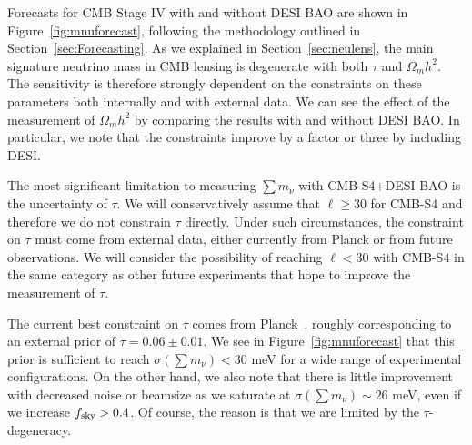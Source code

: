  

Forecasts for CMB Stage IV with and without DESI BAO are shown in Figure~\ref{fig:mnuforecast}, following the methodology outlined in Section~\ref{sec:Forecasting}.  As we explained in Section~\ref{sec:neulens}, the main signature neutrino mass in CMB lensing is degenerate with both $\tau$ and $\Omega_m h^2$.  The sensitivity is therefore strongly dependent on the constraints on these parameters both internally and with external data.  We can see the effect of the measurement of $\Omega_m h^2$ by comparing the results with and without DESI BAO.  In particular, we note that the constraints improve by a factor or three by including DESI.

The most significant limitation to measuring $\sum m_\nu$ with CMB-S4+DESI BAO is the uncertainty of $\tau$.  We will conservatively assume that $\ell \geq 30$ for CMB-S4 and therefore we do not constrain $\tau$ directly.  Under such circumstances, the constraint on $\tau$ must come from external data, either currently from Planck or from future observations.  We will consider the possibility of reaching $\ell < 30$ with CMB-S4 in the same category as other future experiments that hope to improve the measurement of $\tau$.

The current best constraint on $\tau$ comes from Planck~\cite{Adam:2016hgk}, roughly
corresponding to an external prior of
 $\tau = 0.06 \pm 0.01$.  We see in Figure~\ref{fig:mnuforecast} that
 this prior is sufficient to reach $\sigma(\sum m_\nu) < 30$ meV for a wide range of experimental configurations.  On the other hand, we also note that there is little improvement with decreased noise or beamsize as we saturate at $\sigma(\sum m_\nu) \sim 26$ meV,  even if we increase $f_{\rm sky} >0.4$.  Of course, the reason is that we are limited by the $\tau$-degeneracy.

